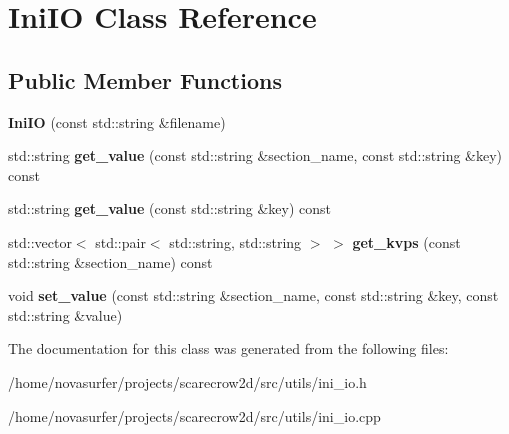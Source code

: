 \hypertarget{classIniIO}{}\section{Ini\+IO Class Reference}
\label{classIniIO}
\subsection*{Public Member Functions}
\begin{DoxyCompactItemize}
\item 
\mbox{\label{classIniIO_a8e1bc8c10965ce40a99bedd063ef3c07}} 
{\bfseries Ini\+IO} (const std\+::string \&filename)
\item 
\mbox{\label{classIniIO_a617c76e527d94cd85e456cf9240e7a5f}} 
std\+::string {\bfseries get\+\_\+value} (const std\+::string \&section\+\_\+name, const std\+::string \&key) const
\item 
\mbox{\label{classIniIO_aba09415198004635daddac951e6372de}} 
std\+::string {\bfseries get\+\_\+value} (const std\+::string \&key) const
\item 
\mbox{\label{classIniIO_a78b9ecae50b811d52a58e1b5b58faf30}} 
std\+::vector$<$ std\+::pair$<$ std\+::string, std\+::string $>$ $>$ {\bfseries get\+\_\+kvps} (const std\+::string \&section\+\_\+name) const
\item 
\mbox{\label{classIniIO_aa24e3e762df97f6d2a5f69fd0bb33bef}} 
void {\bfseries set\+\_\+value} (const std\+::string \&section\+\_\+name, const std\+::string \&key, const std\+::string \&value)
\end{DoxyCompactItemize}


The documentation for this class was generated from the following files\+:\begin{DoxyCompactItemize}
\item 
/home/novasurfer/projects/scarecrow2d/src/utils/ini\+\_\+io.\+h\item 
/home/novasurfer/projects/scarecrow2d/src/utils/ini\+\_\+io.\+cpp\end{DoxyCompactItemize}

